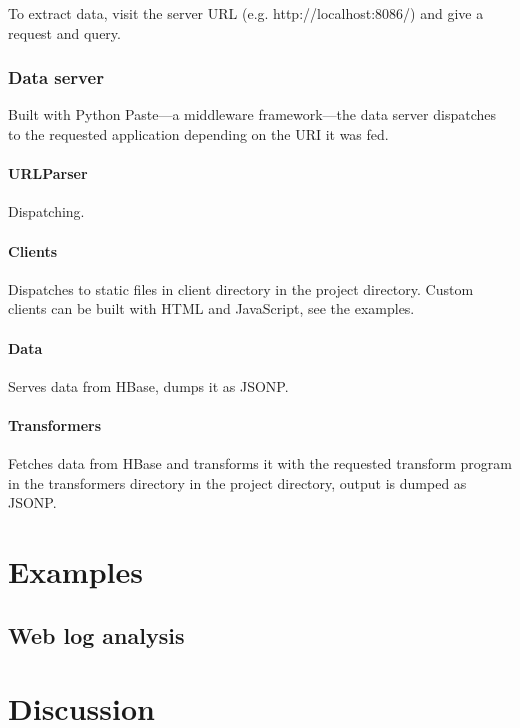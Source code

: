 \documentclass[a4paper,10pt]{book}
\begin{document}
To extract data, visit the server URL (e.g. http://localhost:8086/) and
give a request and query.


\subsection{Data server}

Built with Python Paste---a middleware framework---the data server dispatches
to the requested application depending on the URI it was fed.


\subsubsection{URLParser}

Dispatching.


\subsubsection{Clients}

Dispatches to static files in client directory in the project directory.
Custom clients can be built with HTML and JavaScript, see the examples.


\subsubsection{Data}

Serves data from HBase, dumps it as JSONP.


\subsubsection{Transformers}

Fetches data from HBase and transforms it with the requested transform
program in the transformers directory in the project directory, output is
dumped as JSONP.



\chapter{Examples}

\section{Web log analysis}



\chapter{Discussion}
\end{document}
